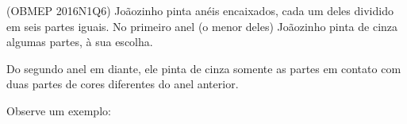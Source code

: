 \documentclass[preview]{standalone}
\begin{document}
\begin{center}
(OBMEP 2016N1Q6) Joãozinho pinta anéis encaixados,
cada um deles dividido em seis partes iguais.
          No primeiro anel (o menor deles) Joãozinho pinta de cinza algumas partes, à sua escolha. 

          Do segundo anel em diante, ele pinta de cinza 
somente as partes em contato com duas partes de cores diferentes do anel anterior.

          Observe um exemplo:
\end{center}
\end{document}
